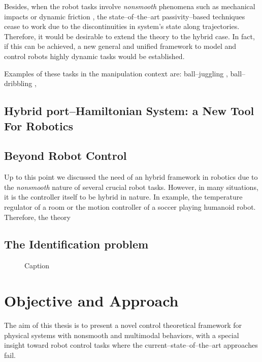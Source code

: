 %
Besides, when the robot tasks involve \textit{nonsmooth} phenomena such as mechanical impacts or dynamic friction \cite{brogliato1999nonsmooth}, the state--of--the--art passivity--based techniques cease to work due to the discontinuities in system's state along trajectories. 
Therefore, it would be desirable to extend the theory to the hybrid case. In fact, if this can be achieved, a new general and unified framework to model and control robots highly dynamic tasks would be established.
%
\newline

Examples of these tasks in the manipulation context are:
ball--juggling \cite{sanfelice2007hybrid, tian2013}, ball--dribbling \cite{Batz2010, haddadin2018exploiting}, \cite{ruggero2018}
%
\subsection{Hybrid port--Hamiltonian System: a New Tool For Robotics}
%

%
\subsection{Beyond Robot Control}
Up to this point we discussed the need of an hybrid framework in robotics due to the \textit{nonsmooth} nature of several crucial robot tasks.
However, in many situations, it is the controller itself to be hybrid in nature. In example, the temperature regulator of a room or the motion controller of a soccer playing humanoid robot. 
Therefore, the theory

\subsection{The Identification problem}

\begin{figure}
    \centering
    
    \caption{Caption}
    \label{fig:my_label}
\end{figure}
\clearpage

\section{{Objective and Approach}}
The aim of this thesis is to present a novel control theoretical framework for physical systems with nonsmooth and multimodal behaviors, with a special insight toward robot control tasks where the current--state--of--the--art approaches fail.

